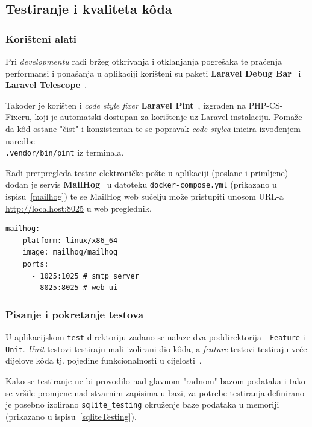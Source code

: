 \subsection{Testiranje i kvaliteta k\^oda}

\subsubsection{Korišteni alati}
Pri \textit{developmentu} radi bržeg otkrivanja i otklanjanja pogrešaka te praćenja performansi i ponašanja u aplikaciji korišteni su paketi \textbf{Laravel Debug Bar}~\cite{laravelDebugbarGitHub} i \textbf{Laravel Telescope}~\cite{telescope}.

Također je korišten i \textit{code style fixer} \textbf{Laravel Pint}~\cite{pint}, izgrađen na PHP-CS-Fixeru, koji je automatski dostupan za korištenje uz Laravel instalaciju. Pomaže da k\^od ostane "čist" i konzistentan te se popravak \textit{code stylea} inicira izvođenjem naredbe \\ \texttt{.vendor/bin/pint} iz terminala. 

Radi pretpregleda testne elektroničke pošte u aplikaciji (poslane i primljene) dodan je servis \textbf{MailHog}~\cite{mailhogGitHub} u datoteku \texttt{docker-compose.yml} (prikazano u ispisu~\ref{mailhog}) te se MailHog web sučelju može pristupiti unosom URL-a \url{http://localhost:8025} u web preglednik.

\begin{lstlisting}[caption={\texttt{mailhog} servis unutar \texttt{docker-compose.yml} datoteke}, label=mailhog]
  mailhog:
    platform: linux/x86_64
    image: mailhog/mailhog
    ports:
      - 1025:1025 # smtp server
      - 8025:8025 # web ui
\end{lstlisting}

\subsubsection{Pisanje i pokretanje testova}
U aplikacijskom \texttt{test} direktoriju zadano se nalaze dva poddirektorija - \texttt{Feature} i \texttt{Unit}. \textit{Unit} testovi testiraju mali izolirani dio k\^oda, a \textit{feature} testovi testiraju veće dijelove k\^oda tj. pojedine funkcionalnosti u cijelosti~\cite{testing}.

Kako se testiranje ne bi provodilo nad glavnom "radnom" bazom podataka i tako se vršile promjene nad stvarnim zapisima u bazi, za potrebe testiranja definirano je posebno izolirano \texttt{sqlite\_testing} okruženje baze podataka u memoriji (prikazano u ispisu~\ref{sqliteTesting}).

